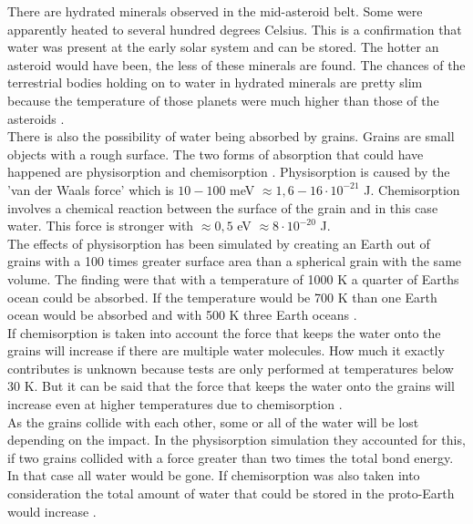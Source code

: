 \newpage
There are hydrated minerals observed in the mid-asteroid belt. Some were apparently heated to several hundred degrees Celsius. This is a confirmation that water was present at the early solar system and can be stored. The hotter an asteroid would have been, the less of these minerals are found. The chances of the terrestrial bodies holding on to water in hydrated minerals are pretty slim because the temperature of those planets were much higher than those of the asteroids \cite{TPRivkin}.\\

There is also the possibility of water being absorbed by grains. Grains are small objects with a rough surface. The two forms of absorption that could have happened are physisorption and chemisorption \cite[p.~523]{TPoriginWater}. Physisorption is caused by the 'van der Waals force' which is $10 - 100$ meV $\approx 1,6 - 16 \cdot 10^{-21}$ J. Chemisorption involves a chemical reaction between the surface of the grain and in this case water. This force is stronger with $\approx 0,5$ eV $\approx 8 \cdot 10^{-20}$ J.\\

The effects of physisorption has been simulated by creating an Earth out of grains with a 100 times greater surface area than a spherical grain with the same volume. The finding were that with a temperature of 1000 K a quarter of Earths ocean could be absorbed. If the temperature would be 700 K than one Earth ocean would be absorbed and with 500 K three Earth oceans \cite{TPStimpf1} \cite{TPStimpf2}.\\

If chemisorption is taken into account the force that keeps the water onto the grains will increase if there are multiple water molecules. How much it exactly contributes is unknown because tests are only performed at temperatures below 30 K. But it can be said that the force that keeps the water onto the grains will increase even at higher temperatures due to chemisorption \cite{TPchemistry}. \\

As the grains collide with each other, some or all of the water will be lost depending on the impact. In the physisorption simulation they accounted for this, if two grains collided with a force greater than two times the total bond energy. In that case all water would be gone. If chemisorption was also taken into consideration the total amount of water that could be stored in the proto-Earth would increase \cite{TPStimpf1} \cite{TPStimpf2}.


